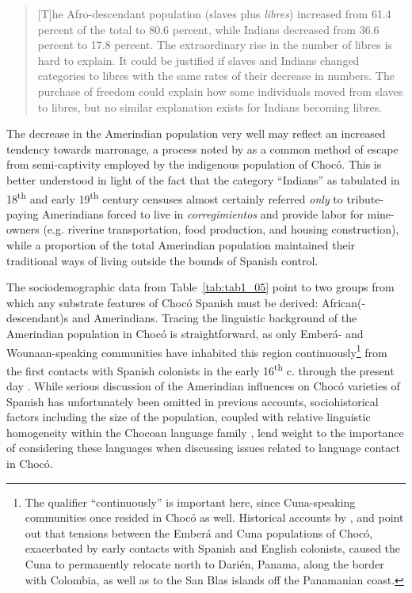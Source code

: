 \documentclass[output=paper,colorlinks,citecolor=brown]{langscibook}
\begin{document}
\begin{quote}
    [T]he Afro-descendant population (slaves plus \emph{libres}) increased from 61.4 percent of the total to 80.6 percent, while Indians decreased from 36.6 percent to 17.8 percent. The extraordinary rise in the number of libres is hard to explain. It could be justified if slaves and Indians changed categories to libres with the same rates of their decrease in numbers. The purchase of freedom could explain how some individuals moved from slaves to libres, but no similar explanation exists for Indians becoming libres. \parencite[50]{Leal_2018}
\end{quote}

The decrease in the Amerindian population very well may reflect an increased tendency towards marronage, a process noted by \citet{WernerCantor_2000} as a common method of escape from semi-captivity employed by the indigenous population of Chocó. This is better understood in light of the fact that the category “Indians” as tabulated in 18\textsuperscript{th} and early 19\textsuperscript{th} century censuses almost certainly referred \emph{only} to tribute-paying Amerindians forced to live in \emph{corregimientos} and provide labor for mine-owners (e.g. riverine transportation, food production, and housing construction), while a proportion of the total Amerindian population maintained their traditional ways of living outside the bounds of Spanish control.

The sociodemographic data from Table~\ref{tab:tab1_05} point to two groups from which any substrate features of Chocó Spanish must be derived: African(-descendant)s and Amerindians. Tracing the linguistic background of the Amerindian population in Chocó is straightforward, as only Emberá- and Wounaan-speaking communities have inhabited this region continuously\footnote{The qualifier “continuously” is important here, since Cuna-speaking communities once resided in Chocó as well. Historical accounts by \citet{WernerCantor_2000,Williams_2005}, and \citet{VargasSarmiento_1993} point out that tensions between the Emberá and Cuna populations of Chocó, exacerbated by early contacts with Spanish and English colonists, caused the  Cuna to permanently relocate north to Darién, Panama, along the border with Colombia, as well as to the San Blas islands off the Panamanian coast.} from the first contacts with Spanish colonists in the early 16\textsuperscript{th} c. through the present day \citep{JimenezMeneses_2004,Williams_2005}. While serious discussion of the Amerindian influences on Chocó varieties of Spanish has unfortunately been omitted in previous accounts, sociohistorical factors including the size of the population, coupled with relative linguistic homogeneity within the Chocoan language family \citep{Loewen_1957,Loewen_1960,Loewen_1963}, lend weight to the importance of considering these languages when discussing issues related to language contact in Chocó.
\end{document}
